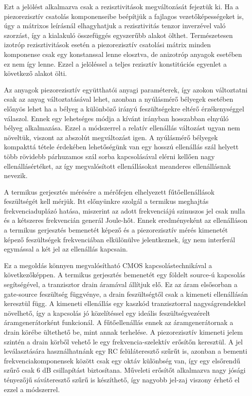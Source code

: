 Ezt a jelölést alkalmazva csak a rezisztivitások megváltozását fejeztük ki. Ha a piezorezisztív csatolás komponenseibe beépítjük a fajlagos vezetőképességeket is, úgy a mátrixos leírásnál elhagyhatjuk a rezisztivitás tenzor inverzével való szorzást, így a kialakuló összefüggés egyszerűbb alakot ölthet. Természetesen izotróp rezisztivitások esetén a piezorezisztív csatolási mátrix minden komponense csak egy konstanssal lenne elosztva, de anizotróp anyagok esetében ez nem így lenne. Ezzel a jelöléssel a teljes rezisztív konstitúciós egyenlet a következő alakot ölti.


Az anyagok piezorezisztív együtthatói anyagi paraméterek, így azokon változtatni csak az anyag változtatásával lehet, azonban a nyúlásmérő bélyegek esetében előnyös lehet ha a bélyeg a különböző irányú feszültségekre eltérő érzékenységgel válaszol. Ennek egy lehetséges módja a kívánt irányban hosszabban elnyúló bélyeg alkalmazása. Ezzel a módszerrel a relatív ellenállás változást ugyan nem növeltük, viszont az abszolút megváltozást igen. A nyúlásmérő bélyegek kompakttá tétele érdekében lehetőségünk van egy hosszú ellenállás szál helyett több rövidebb párhuzamos szál sorba kapcsolásával elérni kellően nagy ellenállásértéket, az így megvalósított ellenállásokat meanderes ellenállásnak nevezik.

A termikus gerjesztés mérésére a mérőfejen elhelyezett fűtőellenállások feszültségét kell mérjük. Itt előnyünkre szolgál a termikus meghajtás frekvenciaduplázó hatása, miszerint az adott frekvenciájú szinuszos jel csak nulla és a kétszeres frekvencián generál Joule-hőt. Ennek eredményeként az ellenálláson a termikus gerjesztés bemenetét képező és a piezorezisztív mérés kimenetét képező feszültségek frekvenciában elkülönülve jelentkeznek, így nem interferál egymással a két jel az ellenállás kapcsain.

Ez a megoldás könnyen megvalósítható CMOS kapcsolástechnikával a következőképpen. A termikus gerjesztés bemenetét egy földelt source-ú kapcsolás segítségével, a tranzisztor drain áramával állítjuk elő. Ez az áram elsősorban a gate-source feszültség függvénye, a drain feszültségtől csak a kimeneti ellenállásán keresztül függ. A kimeneti ellenállás egy kaszkód tranzisztorral nagyságrendekkel növelhető, így a kapcsolás jó közelítéssel egy ideális feszültségvezérelt áramgenerátorként funkcionál. A fűtőellenállás ennek az áramgenerátornak a drain körébe ültethető be, mint annak terhelése. A piezorezisztív kimeneti jelem szintén a drain körből vehető le egy frekvencia-szelektív erősítőn keresztül. A jel leválasztására használhatnánk egy RC felüláteresztő szűrűt is, azonban a bementi frekvenciakomponensek között csak egy oktáv különbség van, így egy elsőrendű szűrő csak 6 dB csillapítást biztosítana. Műveleti erősítőt alkalmazva nagy jósági tényezőjű sáváteresztő szűrű is készíthető, így nagyobb jel-zaj viszony érhető el ezzel a módszerrel.

